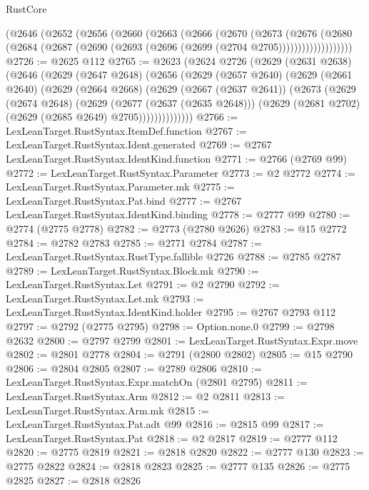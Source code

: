 \begin{lexlean}{RustCore}
\begin{coremodule}
        (@2646
          (@2652
            (@2656
              (@2660
                (@2663
                  (@2666
                    (@2670
                      (@2673
                        (@2676
                          (@2680
                            (@2684
                              (@2687 (@2690 (@2693 (@2696 (@2699 (@2704 @2705)))))))))))))))))))
@2726 := @2625 @112
@2765 := @2623
    (@2624
      @2726
      (@2629
        (@2631 @2638)
        (@2646
          (@2629
            (@2647 @2648)
            (@2656
              (@2629
                (@2657 @2640)
                (@2629
                  (@2661 @2640)
                  (@2629
                    (@2664 @2668)
                    (@2629
                      (@2667 (@2637 @2641))
                      (@2673
                        (@2629
                          (@2674 @2648)
                          (@2629
                            (@2677 (@2637 (@2635 @2648)))
                            (@2629 (@2681 @2702) (@2629 (@2685 @2649) @2705))))))))))))))
@2766 := LexLeanTarget.RustSyntax.ItemDef.function
@2767 := LexLeanTarget.RustSyntax.Ident.generated
@2769 := @2767 LexLeanTarget.RustSyntax.IdentKind.function
@2771 := @2766 (@2769 @99)
@2772 := LexLeanTarget.RustSyntax.Parameter
@2773 := @2 @2772
@2774 := LexLeanTarget.RustSyntax.Parameter.mk
@2775 := LexLeanTarget.RustSyntax.Pat.bind
@2777 := @2767 LexLeanTarget.RustSyntax.IdentKind.binding
@2778 := @2777 @99
@2780 := @2774 (@2775 @2778)
@2782 := @2773 (@2780 @2626)
@2783 := @15 @2772
@2784 := @2782 @2783
@2785 := @2771 @2784
@2787 := LexLeanTarget.RustSyntax.RustType.fallible @2726
@2788 := @2785 @2787
@2789 := LexLeanTarget.RustSyntax.Block.mk
@2790 := LexLeanTarget.RustSyntax.Let
@2791 := @2 @2790
@2792 := LexLeanTarget.RustSyntax.Let.mk
@2793 := LexLeanTarget.RustSyntax.IdentKind.holder
@2795 := @2767 @2793 @112
@2797 := @2792 (@2775 @2795)
@2798 := Option.none.{0}
@2799 := @2798 @2632
@2800 := @2797 @2799
@2801 := LexLeanTarget.RustSyntax.Expr.move
@2802 := @2801 @2778
@2804 := @2791 (@2800 @2802)
@2805 := @15 @2790
@2806 := @2804 @2805
@2807 := @2789 @2806
@2810 := LexLeanTarget.RustSyntax.Expr.matchOn (@2801 @2795)
@2811 := LexLeanTarget.RustSyntax.Arm
@2812 := @2 @2811
@2813 := LexLeanTarget.RustSyntax.Arm.mk
@2815 := LexLeanTarget.RustSyntax.Pat.adt @99
@2816 := @2815 @99
@2817 := LexLeanTarget.RustSyntax.Pat
@2818 := @2 @2817
@2819 := @2777 @112
@2820 := @2775 @2819
@2821 := @2818 @2820
@2822 := @2777 @130
@2823 := @2775 @2822
@2824 := @2818 @2823
@2825 := @2777 @135
@2826 := @2775 @2825
@2827 := @2818 @2826

\end{coremodule}
\end{lexlean}
